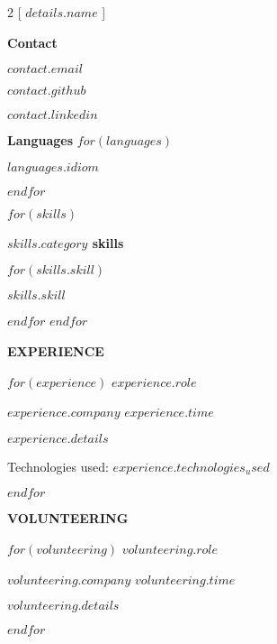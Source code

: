\documentclass[a4paper]{article}
\begin{document}
\begin{multicols}{2}
[
\textcolor{mybluedark}{\textbf{\Huge{$details.name$}
\vspace{15mm} 
}}
]

\textcolor{myblue}{\large{\textbf{Contact}}}

\textcolor{mywhitetext}{$contact.email$}

\textcolor{mywhitetext}{\href{https://github.com/$contact.github$}{$contact.github$}}

\textcolor{mywhitetext}{\href{https://linkedin.com/in/$contact.linkedin$}{$contact.linkedin$}}
\hfill\break
\noindent

\textcolor{myblue}{\large\textbf{Languages}}
$for(languages)$

\textcolor{mywhitetext}{$languages.idiom$}

$endfor$
\vspace{5mm} 

$for(skills)$

\textcolor{myblue}{\large\textbf{$skills.category$ skills}}

$for(skills.skill)$

\textcolor{mywhitetext}{$skills.skill$}

$endfor$
\vspace{5mm} 
$endfor$

\columnbreak
\noindent
\textcolor{myblue}{\large\textbf{\sout{\hfill}EXPERIENCE\sout{\hfill}}}\break

$for(experience)$
\noindent
\textcolor{myblue}{\large\textbf{$experience.role$}}

\noindent
$experience.company$
\hfill
\noindent
\textit{\textcolor{mywhitetext}{$experience.time$}}


\noindent
\textcolor{mywhitetext}{$experience.details$}\hfill \break


\noindent
\textcolor{mywhitetext}{Technologies used: $experience.technologies_used$}\hfill \break

$endfor$

\noindent
\textcolor{myblue}{\large\textbf{\sout{\hfill}VOLUNTEERING\sout{\hfill}}}\break

$for(volunteering)$
\noindent
\textcolor{myblue}{\large\textbf{$volunteering.role$}}

\noindent
$volunteering.company$
\hfill
\noindent
\textit{\textcolor{mywhitetext}{$volunteering.time$}}

\noindent
\textcolor{mywhitetext}{$volunteering.details$} \hfill \break

	
$endfor$
\end{multicols}
\end{document}
